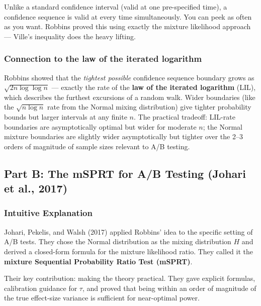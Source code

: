 \documentclass[12pt, a4paper]{article}
\begin{document}
\begin{plainlanguage}
Unlike a standard confidence interval (valid at one pre-specified time),
a confidence sequence is valid at every time simultaneously.  You can peek
as often as you want.  Robbins proved this using exactly the mixture
likelihood approach --- Ville's inequality does the heavy lifting.
\end{plainlanguage}

\subsubsection*{Connection to the law of the iterated logarithm}

\begin{historynote}
Robbins showed that the \emph{tightest possible} confidence sequence boundary
grows as $\sqrt{2n \log \log n}$ --- exactly the rate of the \textbf{law of
the iterated logarithm} (LIL), which describes the furthest excursions of
a random walk.  Wider boundaries (like the $\sqrt{n \log n}$ rate from the
Normal mixing distribution) give tighter probability bounds but larger
intervals at any finite $n$.  The practical tradeoff: LIL-rate boundaries are
asymptotically optimal but wider for moderate $n$; the Normal mixture boundaries
are slightly wider asymptotically but tighter over the 2--3 orders of
magnitude of sample sizes relevant to A/B testing.
\end{historynote}


\subsection{Part B: The mSPRT for A/B Testing (Johari et al., 2017)}

\subsubsection*{Intuitive Explanation}

\begin{intuition}
Johari, Pekelis, and Walsh (2017) applied Robbins' idea to the specific
setting of A/B tests.  They chose the Normal distribution as the mixing
distribution $H$ and derived a closed-form formula for the mixture likelihood
ratio.  They called it the \textbf{mixture Sequential Probability Ratio Test
(mSPRT)}.

Their key contribution: making the theory practical.  They gave explicit
formulas, calibration guidance for $\tau$, and proved that being within
an order of magnitude of the true effect-size variance is sufficient for
near-optimal power.
\end{intuition}
\end{document}
